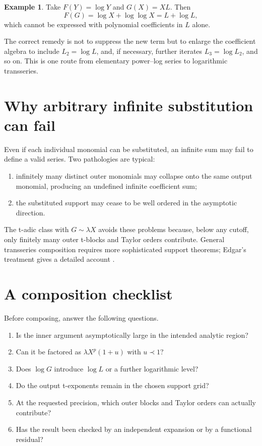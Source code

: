 \documentclass[11pt,openany]{book}
\theoremstyle{definition}
\newtheorem{example}{Example}[chapter]
\theoremstyle{plain}
\theoremstyle{remark}
\begin{document}
\begin{example}
Take \(F(Y)=\log Y\) and \(G(X)=XL\).  Then
\[
 F(G)=\log X+\log\log X=L+\log L,
\]
which cannot be expressed with polynomial coefficients in \(L\) alone.
\end{example}

The correct remedy is not to suppress the new term but to enlarge the
coefficient algebra to include \(L_2=\log L\), and, if necessary, further
iterates \(L_3=\log L_2\), and so on.  This is one route from elementary
power--log series to logarithmic transseries.

\section{Why arbitrary infinite substitution can fail}
Even if each individual monomial can be substituted, an infinite sum may fail
to define a valid series.  Two pathologies are typical:
\begin{enumerate}
\item infinitely many distinct outer monomials may collapse onto the same
      output monomial, producing an undefined infinite coefficient sum;
\item the substituted support may cease to be well ordered in the asymptotic
      direction.
\end{enumerate}
The t-adic class with \(G\sim\lambda X\) avoids these problems because, below
any cutoff, only finitely many outer t-blocks and Taylor orders contribute.
General transseries composition requires more sophisticated support theorems;
Edgar's treatment gives a detailed account \cite{edgar-composition}.

\section{A composition checklist}
Before composing, answer the following questions.
\begin{enumerate}
\item Is the inner argument asymptotically large in the intended analytic
      region?
\item Can it be factored as \(\lambda X^p(1+u)\) with \(u\prec1\)?
\item Does \(\log G\) introduce \(\log L\) or a further logarithmic level?
\item Do the output t-exponents remain in the chosen support grid?
\item At the requested precision, which outer blocks and Taylor orders can
      actually contribute?
\item Has the result been checked by an independent expansion or by a
      functional residual?
\end{enumerate}
\end{document}
